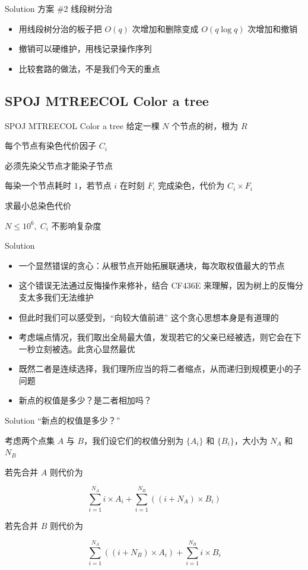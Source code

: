 ﻿\documentclass[aspectratio=169,handout]{ctexbeamer}
\begin{document}
\begin{frame}{Solution}
    方案 \#2 线段树分治
    \begin{itemize}
        \item 用线段树分治的板子把 $O(q)$ 次增加和删除变成 $O(q\log q)$ 次增加和撤销
        \item 撤销可以硬维护，用栈记录操作序列
        \item 比较套路的做法，不是我们今天的重点
    \end{itemize}
\end{frame}










\subsection{SPOJ MTREECOL Color a tree}
\begin{frame}{SPOJ MTREECOL Color a tree}
    给定一棵 $N$ 个节点的树，根为 $R$

每个节点有染色代价因子 $C_i$

必须先染父节点才能染子节点

每染一个节点耗时 $1$，若节点 $i$ 在时刻 $F_i$ 完成染色，代价为 $C_i\times F_i$

求最小总染色代价

$N\leq 10^6,\; C_i$ 不影响复杂度
\end{frame}

\begin{frame}{Solution}
    \begin{itemize}
        \item 一个显然错误的贪心：从根节点开始拓展联通块，每次取权值最大的节点
        \item 这个错误无法通过反悔操作来修补，结合 CF436E 来理解，因为树上的反悔分支太多我们无法维护
        \item 但此时我们可以感受到，“向较大值前进” 这个贪心思想本身是有道理的
        \item 考虑端点情况，我们取出全局最大值，发现若它的父亲已经被选，则它会在下一秒立刻被选。此贪心显然最优
        \item 既然二者是连续选择，我们理所应当的将二者缩点，从而递归到规模更小的子问题
        \item 新点的权值是多少？是二者相加吗？
    \end{itemize}
\end{frame}

\begin{frame}{Solution}
    “新点的权值是多少？”

    考虑两个点集 $A$ 与 $B$，我们设它们的权值分别为 $\{A_i\}$ 和 $\{B_i\}$，大小为 $N_A$ 和 $N_B$

    若先合并 $A$ 则代价为

    $$
        \sum_{i=1}^{N_A}{i\times A_i}+\sum_{i=1}^{N_B}{\left((i+N_A)\times B_i\right)}
    $$

    若先合并 $B$ 则代价为

    $$
        \sum_{i=1}^{N_A}{\left((i+N_B)\times A_i\right)}+\sum_{i=1}^{N_B}{i\times B_i}
    $$

\end{frame}
\end{document}
